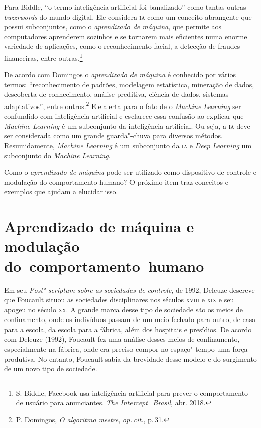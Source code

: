 Para Biddle, ``o termo inteligência artificial foi banalizado''
como tantas outras \textit{buzzrwords} do mundo digital. Ele considera
\textsc{ia} como um conceito abrangente que possui subconjuntos, como o
\textit{aprendizado de máquina}, que permite aos computadores aprenderem sozinhos
e se tornarem mais eficientes numa enorme variedade de aplicações, como
o reconhecimento facial, a detecção de fraudes financeiras, entre outras.\footnote{S. Biddle, Facebook usa inteligência artificial para prever o
comportamento de usuário para anunciantes. \textit{The Intercept\_Brasil}, abr. 2018.}

De acordo com Domingos o \textit{aprendizado de máquina} é conhecido por
vários termos: ``reconhecimento de padrões, modelagem estatística,
mineração de dados, descoberta de conhecimento, análise preditiva,
ciência de dados, sistemas adaptativos'', entre outros.\footnote{P. Domingos, \textit{O algoritmo mestre}, \textit{op.\,cit.}, p.\,31.} Ele
alerta para o fato de o \textit{Machine Learning} ser confundido com
inteligência artificial e esclarece essa confusão ao explicar que
\textit{Machine Learning} é um subconjunto da inteligência artificial. Ou
seja, a \textsc{ia} deve ser considerada como um grande guarda"-chuva para
diversos métodos. Resumidamente, \textit{Machine Learning} é um subconjunto
da \textsc{ia} e \textit{Deep Learning} um subconjunto do \textit{Machine Learning}.

Como o \textit{aprendizado de máquina} pode ser utilizado como dispositivo de
controle e modulação do comportamento humano? O próximo item traz
conceitos e exemplos que ajudam a elucidar isso.

\section{Aprendizado de máquina e modulação do~comportamento~humano}

Em seu \textit{Post"-scriptum sobre as sociedades de controle}, de 1992, Deleuze
descreve que Foucault situou as sociedades disciplinares nos
séculos \textsc{xviii} e \textsc{xix} e seu apogeu no século \textsc{xx}. A grande marca desse tipo
de sociedade são os meios de confinamento, onde os indivíduos passam de
um meio fechado para outro, de casa para a escola, da escola para a
fábrica, além dos hospitais e presídios. De acordo com Deleuze (1992),
Foucault fez uma análise desses meios de confinamento, especialmente na
fábrica, onde era preciso compor no espaço"-tempo uma força produtiva. No
entanto, Foucault sabia da brevidade desse modelo e do surgimento de um
novo tipo de sociedade.

